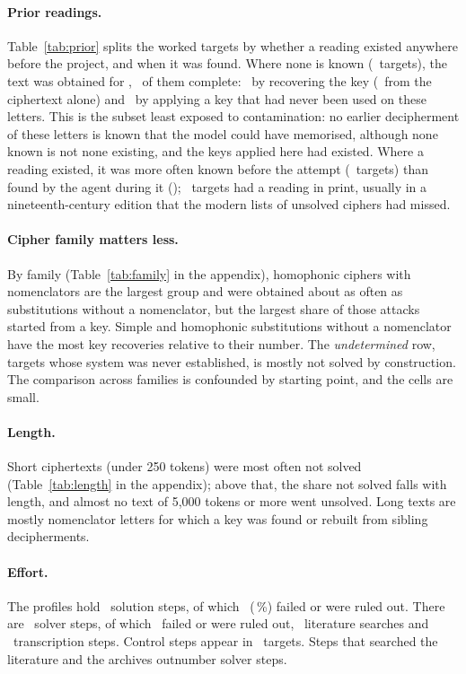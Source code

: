 \documentclass[11pt]{article}
\begin{document}
\paragraph{Prior readings.} Table~\ref{tab:prior} splits the worked targets by whether a reading existed anywhere before the project, and when it was found. Where none is known (\Nclean\ targets), the text was obtained for \Ncleanobtained, \Ncleancomplete\ of them complete: \Ncleanrecovered\ by recovering the key (\NcleanCT\ from the ciphertext alone) and \NcleanApplied\ by applying a key that had never been used on these letters. This is the subset least exposed to contamination: no earlier decipherment of these letters is known that the model could have memorised, although none known is not none existing, and the keys applied here had existed. Where a reading existed, it was more often known before the attempt (\NpriorFoundBefore\ targets) than found by the agent during it (\NpriorFoundDuring); \Nprintprior\ targets had a reading in print, usually in a nineteenth-century edition that the modern lists of unsolved ciphers had missed.

\paragraph{Cipher family matters less.} By family (Table~\ref{tab:family} in the appendix), homophonic ciphers with nomenclators are the largest group and were obtained about as often as substitutions without a nomenclator, but the largest share of those attacks started from a key. Simple and homophonic substitutions without a nomenclator have the most key recoveries relative to their number. The \emph{undetermined} row, targets whose system was never established, is mostly not solved by construction. The comparison across families is confounded by starting point, and the cells are small.

\paragraph{Length.} Short ciphertexts (under 250 tokens) were most often not solved (Table~\ref{tab:length} in the appendix); above that, the share not solved falls with length, and almost no text of 5,000 tokens or more went unsolved. Long texts are mostly nomenclator letters for which a key was found or rebuilt from sibling decipherments.

\paragraph{Effort.} The profiles hold \Nsteps\ solution steps, of which \Nfailedsteps\ (\PctFailedSteps\,\%) failed or were ruled out. There are \Nsolversteps\ solver steps, of which \Nsolverfailed\ failed or were ruled out, \Nlitsteps\ literature searches and \Ntranssteps\ transcription steps. Control steps appear in \Ncontrol\ targets. Steps that searched the literature and the archives outnumber solver steps.
\end{document}
